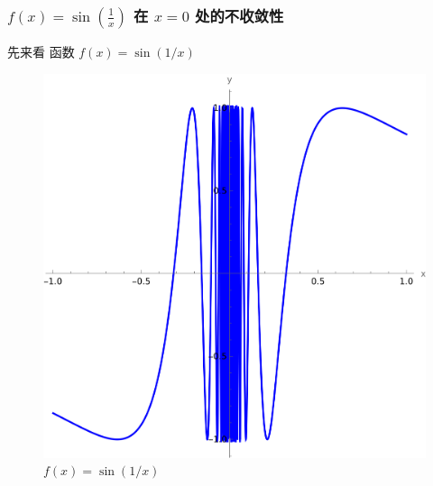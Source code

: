 \documentclass[
10pt, 
aspectratio=43, 
]{beamer}
\begin{document}
\begin{frame}
\frametitle{$f(x) = \sin\left(\frac{1}{x}\right)$ 在 $x=0$ 处的不收敛性}
先来看 函数 $f(x) = \sin(1/x)$
\begin{figure}
    \centering
    \includegraphics[width=0.4\linewidth]{sin1x.png}
    \caption{$f(x) = \sin(1/x)$}

\end{figure}
\end{frame}
\end{document}
